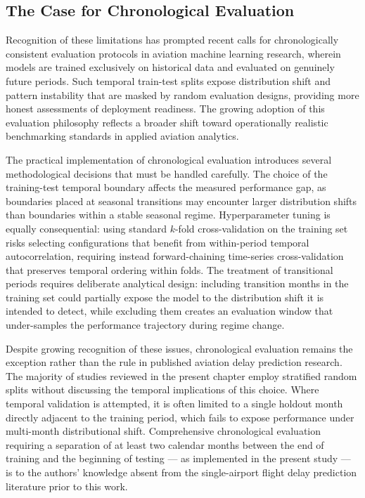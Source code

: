 \documentclass{report}
\begin{document}
\subsection{The Case for Chronological Evaluation}

Recognition of these limitations has prompted recent calls for chronologically consistent evaluation protocols in aviation machine learning research, wherein models are trained exclusively on historical data and evaluated on genuinely future periods. Such temporal train-test splits expose distribution shift and pattern instability that are masked by random evaluation designs, providing more honest assessments of deployment readiness. The growing adoption of this evaluation philosophy reflects a broader shift toward operationally realistic benchmarking standards in applied aviation analytics.

The practical implementation of chronological evaluation introduces several 
methodological decisions that must be handled carefully. The choice of the 
training-test temporal boundary affects the measured performance gap, as 
boundaries placed at seasonal transitions may encounter larger distribution 
shifts than boundaries within a stable seasonal regime. Hyperparameter tuning 
is equally consequential: using standard $k$-fold cross-validation on the 
training set risks selecting configurations that benefit from within-period 
temporal autocorrelation, requiring instead forward-chaining time-series 
cross-validation that preserves temporal ordering within folds. The treatment 
of transitional periods requires deliberate analytical design: including 
transition months in the training set could partially expose the model to the 
distribution shift it is intended to detect, while excluding them creates an 
evaluation window that under-samples the performance trajectory during regime 
change.

Despite growing recognition of these issues, chronological evaluation remains 
the exception rather than the rule in published aviation delay prediction 
research. The majority of studies reviewed in the present chapter employ 
stratified random splits without discussing the temporal implications of this 
choice. Where temporal validation is attempted, it is often limited to a single 
holdout month directly adjacent to the training period, which fails to expose 
performance under multi-month distributional shift. Comprehensive chronological 
evaluation requiring a separation of at least two calendar months between the 
end of training and the beginning of testing --- as implemented in the present 
study --- is to the authors' knowledge absent from the single-airport flight 
delay prediction literature prior to this work.
\end{document}
